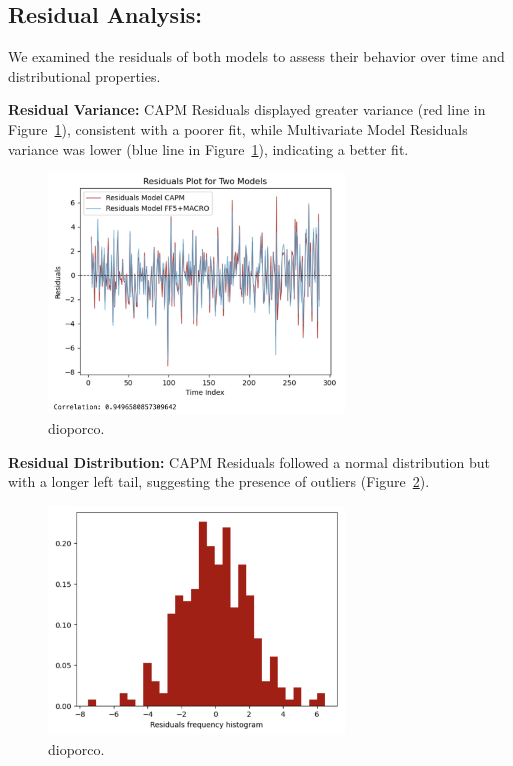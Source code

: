 \subsection{Residual Analysis:}
We examined the residuals of both models to assess their behavior over time and distributional properties.

\textbf{Residual Variance:} CAPM Residuals displayed greater variance (red line in Figure~\ref{fig:7_5}), consistent with a poorer fit,
while Multivariate Model Residuals variance was lower (blue line in Figure~\ref{fig:7_5}), indicating a better fit.

\begin{figure}[h!]
    \centering
    \includegraphics[width=0.7\textwidth]{images/7_5.png}
    \caption{dioporco.}\label{fig:7_5}
\end{figure}

\textbf{Residual Distribution:} CAPM Residuals followed a normal distribution but with a longer left tail, suggesting the
presence of outliers (Figure~\ref{fig:7_6}).

\begin{figure}[h!]
    \centering
    \includegraphics[width=0.7\textwidth]{images/7_6.png}
    \caption{dioporco.}\label{fig:7_6}
\end{figure}

